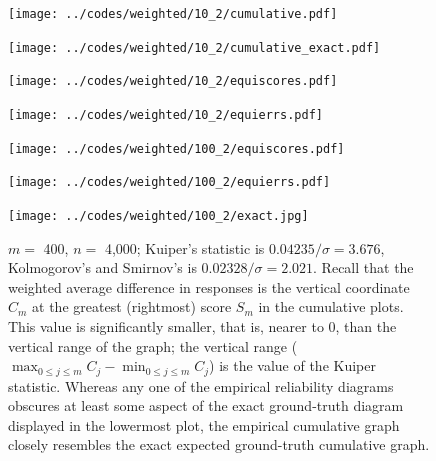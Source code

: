 \documentclass[]{fairmeta}
\begin{document}
\begin{figure}
\begin{centering}

\parbox{\imsize}{\texttt{[image: ../codes/weighted/10\_2/cumulative.pdf]}}
\quad\quad
\parbox{\imsize}{\texttt{[image: ../codes/weighted/10\_2/cumulative\_exact.pdf]}}

\vspace{\vertsep}

\parbox{\imsize}{\texttt{[image: ../codes/weighted/10\_2/equiscores.pdf]}}
\quad\quad
\parbox{\imsize}{\texttt{[image: ../codes/weighted/10\_2/equierrs.pdf]}}

\vspace{\vertsep}

\parbox{\imsize}{\texttt{[image: ../codes/weighted/100\_2/equiscores.pdf]}}
\quad\quad
\parbox{\imsize}{\texttt{[image: ../codes/weighted/100\_2/equierrs.pdf]}}

\vspace{\vertsep}

\parbox{\imsize}{\texttt{[image: ../codes/weighted/100\_2/exact.jpg]}}

\end{centering}
\caption{$m =$ 400, $n =$ 4,000;
         Kuiper's statistic is $0.04235 / \sigma = 3.676$,
         Kolmogorov's and Smirnov's is $0.02328 / \sigma = 2.021$.
         Recall that the weighted average difference in responses
         is the vertical coordinate $C_m$ at the greatest (rightmost) score
         $S_m$ in the cumulative plots. This value is significantly smaller,
         that is, nearer to 0, than the vertical range of the graph;
         the vertical range
         ($\max_{0 \le j \le m} C_j - \min_{0 \le j \le m} C_j$) is the value
         of the Kuiper statistic.
         Whereas any one of the empirical reliability diagrams obscures
         at least some aspect of the exact ground-truth diagram
         displayed in the lowermost plot, the empirical cumulative graph
         closely resembles the exact expected ground-truth cumulative graph.
}
\label{ex2}
\end{figure}
\end{document}
